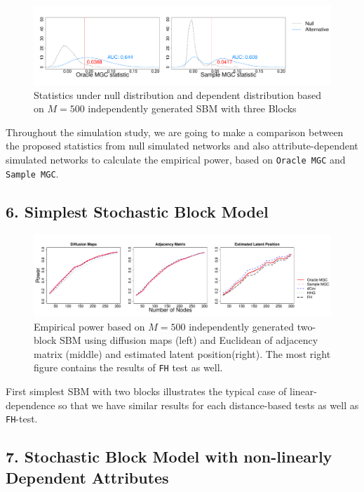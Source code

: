 \documentclass[12pt]{article}
\begin{document}
\begin{figure}[H]
	\centering
	\includegraphics[width=6in]{../Figure/density.pdf}
	\caption{Statistics under null distribution and dependent distribution based on $M = 500$ independently generated SBM with three Blocks}
	\label{fig:density}
\end{figure}	
 
 Throughout the simulation study, we are going to make a comparison between the proposed statistics from null simulated networks and also attribute-dependent simulated networks to calculate the empirical power, based on \texttt{Oracle MGC} and \texttt{Sample MGC}.
 
 
\subsection*{6. Simplest Stochastic Block Model}
 
\begin{figure}[H]
	\centering
	\includegraphics[width=6in]{../Figure/twoSBM.pdf}
	\caption{Empirical power based on $M = 500$ independently generated two-block SBM using diffusion maps (left) and Euclidean of adjacency matrix (middle)  and estimated latent position(right). The most right figure contains the results of \texttt{FH} test as well.}
	\label{fig:twoSBM}
\end{figure}

First simplest SBM with two blocks illustrates the typical case of linear-dependence so that we have similar results for each distance-based tests as well as \texttt{FH}-test.


\subsection*{7. Stochastic Block Model with non-linearly Dependent Attributes}
\end{document}
